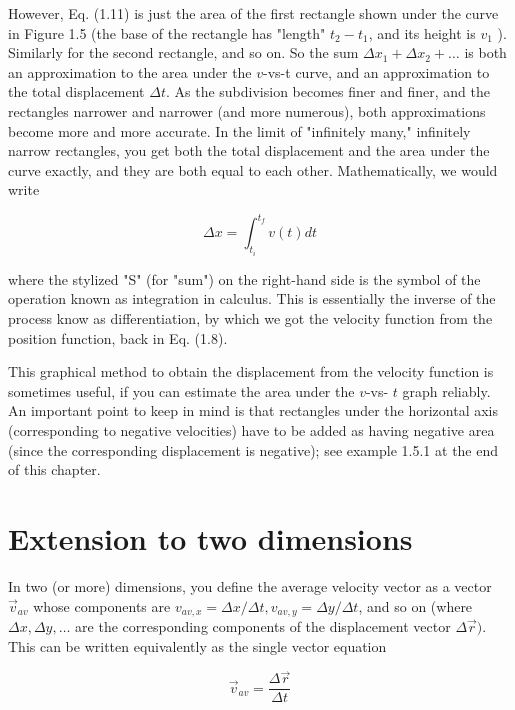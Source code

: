 \documentclass[10pt]{article}
\begin{document}
However, Eq. (1.11) is just the area of the first rectangle shown under the curve in Figure 1.5 (the base of the rectangle has "length" $t_{2}-t_{1}$, and its height is $v_{1}$ ). Similarly for the second rectangle, and so on. So the sum $\Delta x_{1}+\Delta x_{2}+\ldots$ is both an approximation to the area under the $v$-vs-t curve, and an approximation to the total displacement $\Delta t$. As the subdivision becomes finer and finer, and the rectangles narrower and narrower (and more numerous), both approximations become more and more accurate. In the limit of "infinitely many," infinitely narrow rectangles, you get both the total displacement and the area under the curve exactly, and they are both equal to each other. Mathematically, we would write


\begin{equation*}
\Delta x=\int_{t_{i}}^{t_{f}} v(t) d t \tag{1.12}
\end{equation*}


where the stylized "S" (for "sum") on the right-hand side is the symbol of the operation known as integration in calculus. This is essentially the inverse of the process know as differentiation, by which we got the velocity function from the position function, back in Eq. (1.8).

This graphical method to obtain the displacement from the velocity function is sometimes useful, if you can estimate the area under the $v$-vs- $t$ graph reliably. An important point to keep in mind is that rectangles under the horizontal axis (corresponding to negative velocities) have to be added as having negative area (since the corresponding displacement is negative); see example 1.5.1 at the end of this chapter.

\section*{Extension to two dimensions}
In two (or more) dimensions, you define the average velocity vector as a vector $\vec{v}_{a v}$ whose components are $v_{a v, x}=\Delta x / \Delta t, v_{a v, y}=\Delta y / \Delta t$, and so on (where $\Delta x, \Delta y, \ldots$ are the corresponding components of the displacement vector $\Delta \vec{r})$. This can be written equivalently as the single vector equation


\begin{equation*}
\vec{v}_{a v}=\frac{\Delta \vec{r}}{\Delta t} \tag{1.13}
\end{equation*}
\end{document}
